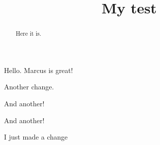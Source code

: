 \documentclass{ximera}
\title{My test}
\begin{document}
\begin{abstract}
  Here it is.
\end{abstract}
\maketitle

Hello. Marcus is great!

Another change.

And another!

And another!

I just made a change
\end{document}
